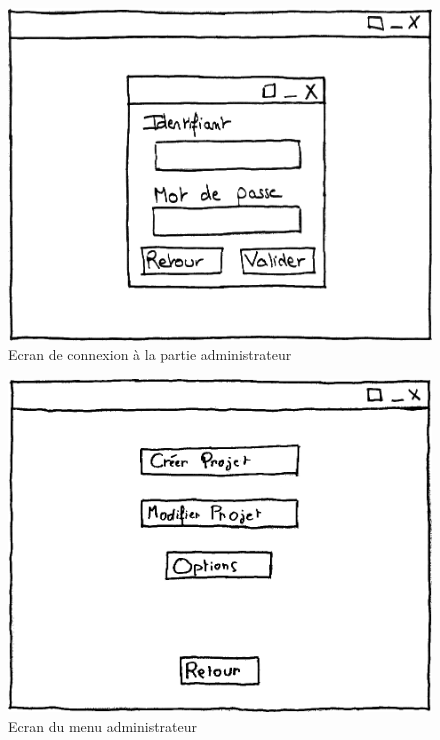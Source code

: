 \documentclass[12pt]{report}
\begin{document}
\begin{figure}
\centering
\includegraphics[scale=0.5]{IHM_5b.png}
\caption{Ecran de connexion à la partie administrateur}
\end{figure}
\begin{figure}
\centering
\includegraphics[scale=0.5]{IHM_4a.png}
\caption{Ecran du menu administrateur}
\end{figure}
\end{document}

